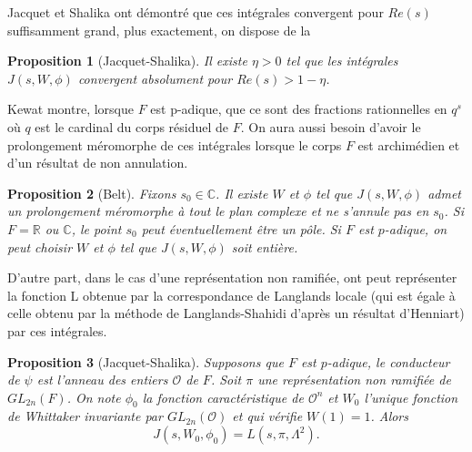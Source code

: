 \documentclass{amsart}
\newtheorem{proposition}{Proposition}[section]
\begin{document}
  Jacquet et Shalika ont démontré que ces intégrales convergent pour $Re(s)$ suffisamment grand, plus exactement, on dispose de la
  \begin{proposition}[Jacquet-Shalika]
  Il existe $\eta > 0$ tel que les intégrales $J(s, W, \phi)$ convergent absolument pour $Re(s) > 1 - \eta$.
  \end{proposition}
  
  Kewat montre, lorsque $F$ est p-adique, que ce sont des fractions rationnelles en $q^{s}$ où $q$ est le cardinal du corps résiduel de $F$. On aura aussi besoin d'avoir le prolongement méromorphe de ces intégrales lorsque le corps $F$ est archimédien et d'un résultat de non annulation.
  \begin{proposition}[Belt]
  \label{nonzero}
  Fixons $s_0 \in \mathbb{C}$. Il existe $W$ et $\phi$ tel que $J(s,W,\phi)$ admet un prolongement méromorphe à tout le plan complexe et ne s'annule pas en $s_0$. Si $F=\mathbb{R}$ ou $\mathbb{C}$, le point $s_0$ peut éventuellement être un pôle. Si $F$ est $p$-adique, on peut choisir $W$ et $\phi$ tel que $J(s, W, \phi)$ soit entière.
  \end{proposition}
  
  D'autre part, dans le cas d'une représentation non ramifiée, ont peut représenter la fonction L obtenue par la correspondance de Langlands locale (qui est égale à celle obtenu par la méthode de Langlands-Shahidi d'après un résultat d'Henniart) par ces intégrales.
  \begin{proposition}[Jacquet-Shalika]
  \label{calculnr}
  Supposons que $F$ est $p$-adique, le conducteur de $\psi$ est l'anneau des entiers $\mathcal{O}$ de $F$. Soit $\pi$ une représentation non ramifiée de $GL_{2n}(F)$. On note $\phi_0$ la fonction caractéristique de $\mathcal{O}^n$ et $W_0$ l'unique fonction de Whittaker invariante par $GL_{2n}(\mathcal{O})$ et qui vérifie $W(1)=1$. Alors
   \begin{equation}
   J(s,W_0,\phi_0) = L(s, \pi, \Lambda^2).
    \end{equation}
  \end{proposition}
  
\end{document}

